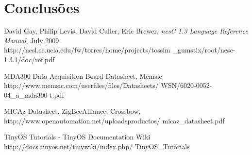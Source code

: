 \documentclass[times,10pt,twocolumn]{article}
\begin{document}
\section{Conclusões}




\begin{thebibliography}{99}  

David Gay, Philip Levis, David Culler, Eric Brewer, \textit{nesC 1.3 Language Reference Manual}, July 2009
\\http://nesl.ee.ucla.edu/fw/torres/home/projects/tossim
\_gumstix/root/nesc-1.3.1/doc/ref.pdf

MDA300 Data Acquisition Board Datasheet, Memsic
\\http://www.memsic.com/userfiles/files/Datasheets/
WSN/6020-0052-04\_a\_mda300-t.pdf

MICAz Datasheet, ZigBee\texttrademark Alliance, Crossbow,
\\http://www.openautomation.net/uploadsproductos/
micaz\_datasheet.pdf

TinyOS Tutorials - TinyOS Documentation Wiki
\\http://docs.tinyos.net/tinywiki/index.php/
TinyOS\_Tutorials


\end{thebibliography}
\end{document}
